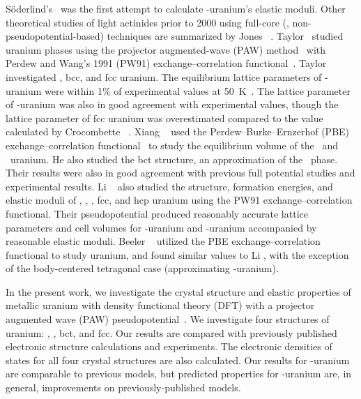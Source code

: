 S\"oderlind's~\cite{soderlind2002first} was the first attempt to calculate
\textalpha-uranium's elastic moduli. Other theoretical studies of light
actinides prior to 2000 using full-core (\ie, non-pseudopotential-based)
techniques are summarized by Jones \etal~\cite{jones2000theoretical}.
Taylor~\cite{taylor2008evaluation} studied uranium phases using the projector
augmented-wave (PAW) method~\cite{Bloechl1994} with Perdew and Wang's 1991
(PW91) exchange--correlation functional~\cite{Perdew1992a,Perdew1993}. Taylor
investigated \textalpha, bcc, and fcc uranium. The equilibrium lattice
parameters of \textalpha-uranium were within 1\% of experimental
values at 50~K~\cite{barrett1963crystal}. The lattice parameter of
\textgamma-uranium was also in good agreement with experimental values, though
the lattice parameter of fcc uranium was overestimated compared to the value
calculated by Crocombette \etal~\cite{crocombette2001plane}. Xiang
\etal~\cite{xiang2008quantum} used the Perdew--Burke--Ernzerhof (PBE) 
exchange--correlation functional~\cite{Perdew1996b,Perdew1997}
to study the equilibrium volume of the \textalpha~and \textgamma~uranium. He
also studied the bct structure, an approximation of the \textbeta~phase.
Their results were also in good agreement with previous full potential studies
and experimental results.
Li \etal~\cite{li2012structure} also studied the
structure, formation energies, and elastic moduli of \textalpha, \textbeta,
\textgamma, fcc, and hcp uranium using the PW91 exchange--correlation
functional. Their pseudopotential produced reasonably accurate lattice
parameters and cell volumes for \textgamma-uranium and \textalpha-uranium
accompanied by reasonable elastic moduli.
Beeler \etal~\cite{beeler2013first} utilized the PBE
exchange--correlation functional to study uranium, and found similar values
to Li \etal, with the exception of the body-centered tetragonal case
(approximating \textbeta-uranium).


In the present work, we investigate the crystal structure and elastic
properties of metallic uranium with density functional theory (DFT) with a
projector augmented wave (PAW) pseudopotential~\cite{Bloechl1994}. We
investigate four structures of uranium: \textalpha, \textgamma, bct, and fcc.
Our results are compared with previously published electronic structure
calculations and experiments. The electronic densities of
states for all four crystal structures are also calculated. Our results for
\textalpha-uranium are comparable to previous models, but predicted properties
for \textgamma-uranium are, in general, improvements on previously-published
models.

